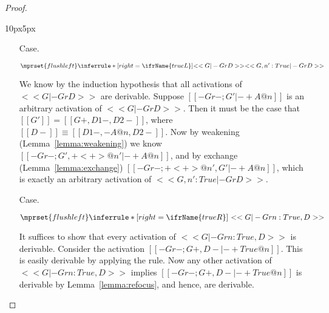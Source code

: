 \begin{proof}
\begin{changemargin}{10px}{5px}
\begin{itemize}
  \item[Case.]\ \\ 
    \begin{center}
      \begin{math}
        $$\mprset{flushleft}
        \inferrule* [right=\ifrName{trueL}] {
          <<G |- Gr D>>
        }{<<G , n' : True |- Gr D>>}
      \end{math}
    \end{center}
    We know by the induction hypothesis that all activations of $<<G |- Gr D>>$
    are derivable.  Suppose $[[-Gr- ; G' |- + A @ n]]$ is an arbitrary
    activation of $<<G |- Gr D>>$.  Then it must be the case that $[[G']] = [[{G}+,{D1}-,{D2}-]]$, where
    $[[{D}-]] \equiv [[{D1}-,-A@n,{D2}-]]$.  Now by weakening (Lemma~\ref{lemma:weakening}) we know 
    $[[-Gr- ; G', + < + > @ n' |- + A @ n]]$, and by exchange (Lemma~\ref{lemma:exchange})
    $[[-Gr- ; + < + > @ n', G' |- + A @ n]]$, which is exactly an arbitrary activation of
    $<<G , n' : True |- Gr D>>$.

  \item[Case.]\ \\ 
    \begin{center}
      \begin{math}
        $$\mprset{flushleft}
        \inferrule* [right=\ifrName{trueR}] {
          \ 
        }{<<G |- Gr n : True, D>>}
      \end{math}
    \end{center}
    It suffices to show that every activation of $<<G |- Gr n : True, D>>$ is derivable.
    Consider the activation $[[-Gr- ; {G}+ , {D}- |- + {True} @ n]]$.  This is easily derivable
    by applying the \ifrName{\normalsize unit} rule.  Now any other activation of
    $<<G |- Gr n : True, D>>$ 
    implies $[[-Gr- ; {G}+ , {D}- |- + {True} @ n]]$ is derivable by Lemma~\ref{lemma:refocus}, and hence,
    are derivable.



\end{itemize}
\end{changemargin}
\end{proof}
